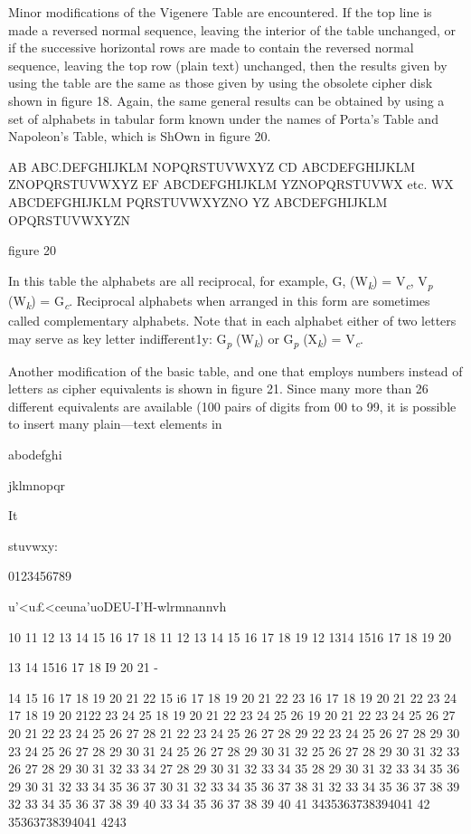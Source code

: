 \mypara Minor modiﬁcations of the Vigenere Table are encountered. If the
top line is made a reversed normal sequence, leaving the interior of the
table unchanged, or if the successive horizontal rows are made to contain
the reversed normal sequence, leaving the top row (plain text) unchanged, then the results given by using the table are the same as those
given by using the obsolete cipher disk shown in ﬁgure 18. Again, the
same general results can be obtained by using a set of alphabets in tabular form known under the names of Porta’s Table and Napoleon’s Table,
which is ShOwn in ﬁgure 20.

AB ABC.DEFGHIJKLM
NOPQRSTUVWXYZ
CD ABCDEFGHIJKLM
ZNOPQRSTUVWXYZ
EF ABCDEFGHIJKLM
YZNOPQRSTUVWX
etc.
WX ABCDEFGHIJKLM
PQRSTUVWXYZNO
YZ ABCDEFGHIJKLM
OPQRSTUVWXYZN

figure 20

In this table the alphabets are all reciprocal, for example, G, (W\textsubscript{\textit{k}}) = V\textsubscript{\textit{c}},
V\textsubscript{\textit{p}} (W\textsubscript{\textit{k}}) = G\textsubscript{\textit{c}}. Reciprocal alphabets when arranged in this form are
sometimes called complementary alphabets. Note that in each alphabet
either of two letters may serve as key letter indifferent1y: G\textsubscript{\textit{p}} (W\textsubscript{\textit{k}}) or
G\textsubscript{\textit{p}} (X\textsubscript{\textit{k}}) = V\textsubscript{\textit{c}}.

\mypara Another modiﬁcation of the basic table, and one that employs numbers instead of letters as cipher equivalents is shown in ﬁgure 21. Since
many more than 26 different equivalents are available (100 pairs of
digits from 00 to 99, it is possible to insert many plain—text elements in
 

 

 

 

abodefghi

jklmnopqr

It

stuvwxy:

0123456789

 

u'<u£<ceuna'uoDEU-I'H-wlrmnannvh

10 11 12 13 14 15 16 17 18
11 12 13 14 15 16 17 18 19
12 1314 1516 17 18 19 20

13 14 1516 17 18 I9 20 21 -

14 15 16 17 18 19 20 21 22
15 i6 17 18 19 20 21 22 23
16 17 18 19 20 21 22 23 24
17 18 19 20 2122 23 24 25
18 19 20 21 22 23 24 25 26
19 20 21 22 23 24 25 26 27
20 21 22 23 24 25 26 27 28
21 22 23 24 25 26 27 28 29
22 23 24 25 26 27 28 29 30
23 24 25 26 27 28 29 30 31
24 25 26 27 28 29 30 31 32
25 26 27 28 29 30 31 32 33
26 27 28 29 30 31 32 33 34
27 28 29 30 31 32 33 34 35
28 29 30 31 32 33 34 35 36
29 30 31 32 33 34 35 36 37
30 31 32 33 34 35 36 37 38
31 32 33 34 35 36 37 38 39
32 33 34 35 36 37 38 39 40
33 34 35 36 37 38 39 40 41
3435363738394041 42
35363738394041 4243

